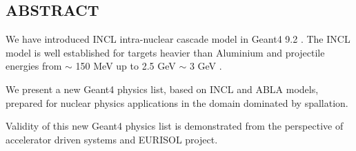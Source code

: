 \documentclass[20pt]{article}
\newenvironment{textbox}
{\begin{lrbox}{\dummybox}\begin{minipage}{0.9\columnwidth}}
{\end{minipage}\end{lrbox}\raisebox{-\depth}{\psshadowbox[framesep=1em,framearc=.1,shadow=true]{\usebox{\dummybox}}}\vspace{0.005\textheight}}
\begin{document}
\begin{center}
\vspace{-2cm}
\begin{multicols}{3}

\begin{textbox}

\section*{{\Huge {\sf ABSTRACT}}}


We have introduced {\sf INCL} \cite{incl} intra-nuclear cascade model in {\sf Geant4 9.2} \cite{g4}.
The {\sf INCL} model is well established for targets heavier than Aluminium
and projectile energies from $\sim$ 150 MeV up to 2.5 GeV $\sim$ 3 GeV \cite{pk08bProceedings}. 

\vspace{1cm}
{\color{udsect}
We present a new {\sf Geant4} physics list, based on {\sf INCL} and {\sf ABLA} models, 
prepared for nuclear physics applications
in the domain dominated by spallation.
}

\vspace{1cm}
Validity of this new {\sf Geant4} physics list 
is demonstrated from the perspective of accelerator driven systems
and EURISOL project.


\end{textbox}

\end{multicols}
\end{center}
\end{document}
